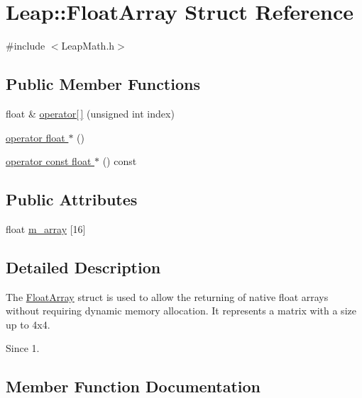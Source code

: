 \hypertarget{struct_leap_1_1_float_array}{}\section{Leap\+:\+:Float\+Array Struct Reference}
\label{struct_leap_1_1_float_array}


{\ttfamily \#include $<$Leap\+Math.\+h$>$}

\subsection*{Public Member Functions}
\begin{DoxyCompactItemize}
\item 
float \& \hyperlink{struct_leap_1_1_float_array_a9c4977609b3c6026fa9fd9091de35c1d}{operator\mbox{[}$\,$\mbox{]}} (unsigned int index)
\item 
\hyperlink{struct_leap_1_1_float_array_ad2e74b6ec198761806cc2d3c8bd28c74}{operator float $\ast$} ()
\item 
\hyperlink{struct_leap_1_1_float_array_aa4f46ac5e3cd4fc7a3f3c5c723a6cb13}{operator const float $\ast$} () const
\end{DoxyCompactItemize}
\subsection*{Public Attributes}
\begin{DoxyCompactItemize}
\item 
float \hyperlink{struct_leap_1_1_float_array_a6f3a08d99f887c2f7afeb90955565a90}{m\+\_\+array} \mbox{[}16\mbox{]}
\end{DoxyCompactItemize}


\subsection{Detailed Description}
The \hyperlink{struct_leap_1_1_float_array}{Float\+Array} struct is used to allow the returning of native float arrays without requiring dynamic memory allocation. It represents a matrix with a size up to 4x4. \begin{DoxySince}{Since}
1. 
\end{DoxySince}


\subsection{Member Function Documentation}
\mbox{\label{struct_leap_1_1_float_array_aa4f46ac5e3cd4fc7a3f3c5c723a6cb13}} 
